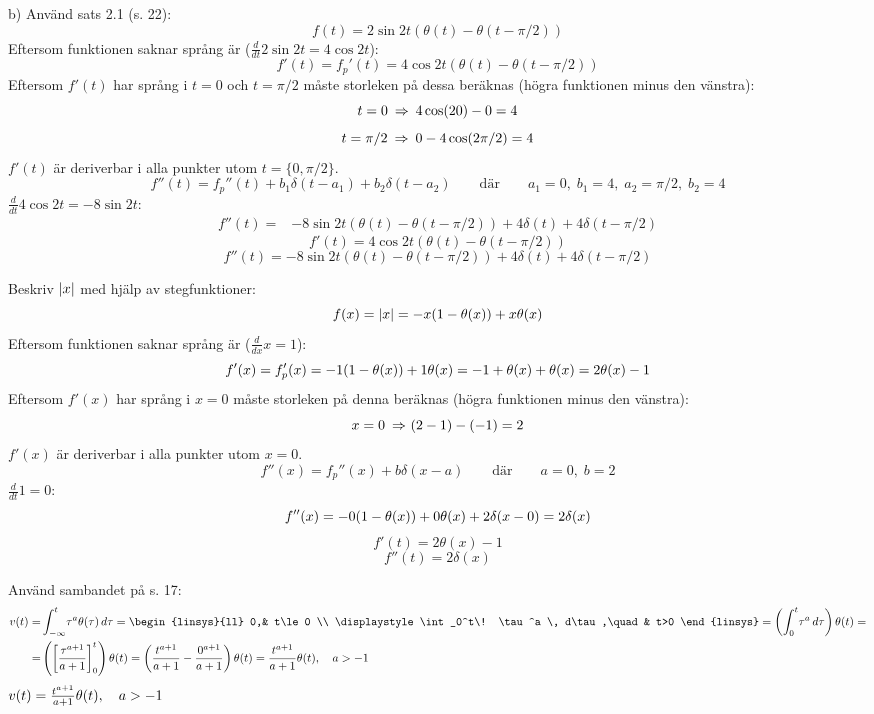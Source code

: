\begin{task}{b)}
	Använd sats 2.1 (s. 22):
	\[f(t)= 2\sin 2t(\theta(t)-\theta(t-\pi/2))\]
	Eftersom funktionen saknar språng är ($\frac{d}{dt}2\sin 2t=4\cos2t$):
	\[f'(t)=f_p'(t)=4\cos2t(\theta(t)-\theta(t-\pi/2))\]
	Eftersom $f'(t)$ har språng i $t=0$ och $t=\pi/2$ måste storleken på dessa beräknas (högra funktionen minus den vänstra):
	\[t=0 \ra 4\cos(2\*0)-0=4\]
	\[t=\pi/2 \ra 0-4\cos(2\*\pi/2)=4\]
	$f'(t)$ är deriverbar i alla punkter utom $t=\{0,\pi/2\}$.
	\[f''(t)=f_p''(t)+b_1\delta(t-a_1)+b_2\delta(t-a_2) \qquad\text{där}\qquad a_1=0,\;b_1=4,\;a_2=\pi/2,\;b_2=4\]
	$\frac{d}{dt}4\cos2t=-8\sin2t$:
	\begin{align*}
	f''(t)=
	&-8\sin2t(\theta(t)-\theta(t-\pi/2))+4\delta(t)+4\delta(t-\pi/2)
	\end{align*}
	\ans 
	\[f'(t)=4\cos2t(\theta(t)-\theta(t-\pi/2))\]
	\[f''(t)=-8\sin2t(\theta(t)-\theta(t-\pi/2))+4\delta(t)+4\delta(t-\pi/2)\]
\end{task}

\begin{task}{2.11}
	Beskriv $\left|x\right|$ med hjälp av stegfunktioner:
	\[f(x) = \left|x\right| = -x(1-\theta(x))+x\theta(x)\]
	Eftersom funktionen saknar språng är ($\frac{d}{dx}x=1$):
	\[f'(x)=f_p'(x) = -1\*(1-\theta(x))+1\*\theta(x) = -1+\theta(x)+\theta(x) = 2\theta(x)-1\]
	Eftersom $f'(x)$ har språng i $x=0$ måste storleken på denna beräknas (högra funktionen minus den vänstra):
	\[x=0 \ra (2-1)-(-1)=2\]
	$f'(x)$ är deriverbar i alla punkter utom $x=0$.
	\[f''(x)=f_p''(x)+b\delta(x-a)\qquad\text{där}\qquad a=0,\;b=2\]
	$\frac{d}{dt}1=0$:
	\[f''(x) = -0\*(1-\theta(x))+0\*\theta(x)+2\delta(x-0)=2\delta(x)\]
	\ans 
	\[f'(t)=2\theta(x)-1\]
	\[f''(t)=2\delta(x)\]
\end{task}

\begin{task}{2.12}
	Använd sambandet på s. 17:
	\begin{align*}
	v(t)=
	&\int_{-\infty}^{t} \! \tau^a\theta(\tau) \, d\tau =
	\begin{linsys}{ll}
		0,& t\le0 \\
		\displaystyle\int_0^t\! \tau^a \, d\tau,\quad & t>0
	\end{linsys}=
	\left(\int_0^t\! \tau^a \, d\tau\right)\theta(t)= \\ =
	&\left(\left[\frac{\tau^{a+1}}{a+1}\right]_0^t\right)\theta(t)=
	\left(\frac{t^{a+1}}{a+1}-\frac{0^{a+1}}{a+1}\right)\theta(t)=
	\frac{t^{a+1}}{a+1}\theta(t)\cond{a>-1}
	\end{align*}
	\ans $v(t)=\frac{t^{a+1}}{a+1}\theta(t), \quad a>-1$
\end{task}

